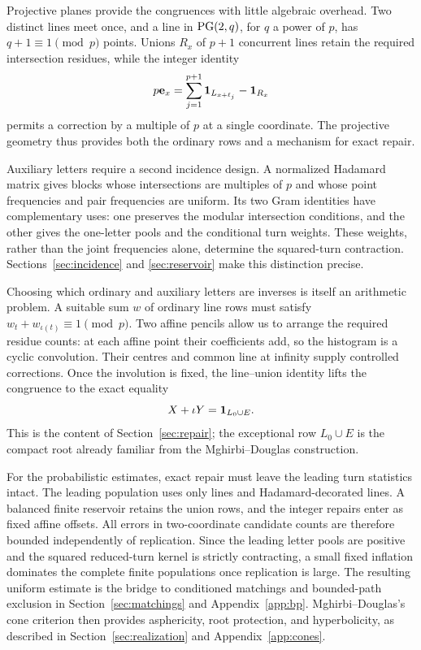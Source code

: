 Projective planes provide the congruences with little algebraic overhead. Two distinct lines meet once, and a line in $\operatorname{PG}(2,q)$, for $q$ a power of $p$, has $q+1\equiv1\pmod p$ points. Unions $R_x$ of $p+1$ concurrent lines retain the required intersection residues, while the integer identity
\[
 p\mathbf e_x=\sum_{j=1}^{p+1}\mathbf1_{L_{x+\ell_j}}-\mathbf1_{R_x}
\]
permits a correction by a multiple of $p$ at a single coordinate. The projective geometry thus provides both the ordinary rows and a mechanism for exact repair.

Auxiliary letters require a second incidence design. A normalized Hadamard matrix gives blocks whose intersections are multiples of $p$ and whose point frequencies and pair frequencies are uniform. Its two Gram identities have complementary uses: one preserves the modular intersection conditions, and the other gives the one-letter pools and the conditional turn weights. These weights, rather than the joint frequencies alone, determine the squared-turn contraction. Sections~\ref{sec:incidence} and \ref{sec:reservoir} make this distinction precise.

Choosing which ordinary and auxiliary letters are inverses is itself an arithmetic problem. A suitable sum $w$ of ordinary line rows must satisfy $w_t+w_{\iota(t)}\equiv1\pmod p$. Two affine pencils allow us to arrange the required residue counts: at each affine point their coefficients add, so the histogram is a cyclic convolution. Their centres and common line at infinity supply controlled corrections. Once the involution is fixed, the line--union identity lifts the congruence to the exact equality
\[
 X+\iota Y=\mathbf1_{L_0\cup E}.
\]
This is the content of Section~\ref{sec:repair}; the exceptional row $L_0\cup E$ is the compact root already familiar from the Mghirbi--Douglas construction.

For the probabilistic estimates, exact repair must leave the leading turn statistics intact. The leading population uses only lines and Hadamard-decorated lines. A balanced finite reservoir retains the union rows, and the integer repairs enter as fixed affine offsets. All errors in two-coordinate candidate counts are therefore bounded independently of replication. Since the leading letter pools are positive and the squared reduced-turn kernel is strictly contracting, a small fixed inflation dominates the complete finite populations once replication is large. The resulting uniform estimate is the bridge to conditioned matchings and bounded-path exclusion in Section~\ref{sec:matchings} and Appendix~\ref{app:bp}. Mghirbi--Douglas's cone criterion then provides asphericity, root protection, and hyperbolicity, as described in Section~\ref{sec:realization} and Appendix~\ref{app:cones}.

